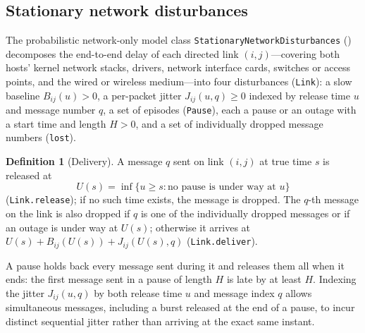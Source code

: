 \documentclass[11pt,a4paper]{article}
\newcommand{\lean}[1]{\texttt{#1}}
\theoremstyle{definition}
\newtheorem{definition}{Definition}[section]
\begin{document}
\subsection{Stationary network disturbances}

The probabilistic network-only model class
\lean{StationaryNetworkDisturbances}
() decomposes the end-to-end
delay of each directed link $(i, j)$---covering both hosts' kernel network
stacks, drivers, network interface cards, switches or access points, and the
wired or wireless medium---into four disturbances (\lean{Link}): a slow
baseline $B_{ij}(u) > 0$, a per-packet jitter $J_{ij}(u, q) \ge 0$ indexed
by release time $u$ and message number $q$, a set of episodes
(\lean{Pause}), each a pause or an outage with a start time and length
$H > 0$, and a set of individually dropped message numbers (\lean{lost}).

\begin{definition}[Delivery]
A message $q$ sent on link $(i, j)$ at true time $s$ is released at
\[
  U(s) = \inf\{u \ge s : \text{no pause is under way at } u\}
\]
(\lean{Link.release}); if no such time exists, the message is dropped. The
$q$-th message on the link is also dropped if $q$ is one of the individually
dropped messages or if an outage is under way at $U(s)$; otherwise it
arrives at $U(s) + B_{ij}(U(s)) + J_{ij}(U(s), q)$ (\lean{Link.deliver}).
\end{definition}

A pause holds back every message sent during it and releases them all when
it ends: the first message sent in a pause of length $H$ is late by at least
$H$. Indexing the jitter $J_{ij}(u, q)$ by both release time $u$ and message
index $q$ allows simultaneous messages, including a burst released at the
end of a pause, to incur distinct sequential jitter rather than arriving at
the exact same instant.
\end{document}
